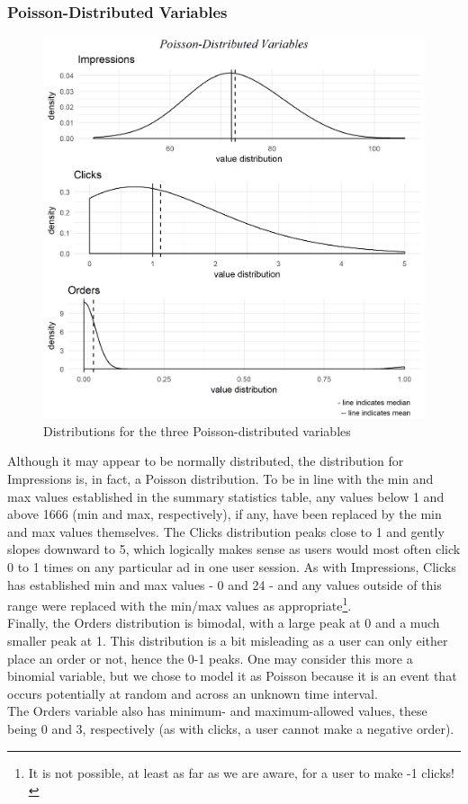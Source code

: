 \subsubsection{Poisson-Distributed Variables}
\begin{figure}[!h]
    \centering
    \includegraphics[scale = 0.7]{poisson_plots.png}
    \caption{Distributions for the three Poisson-distributed variables}
    \label{fig:Poission}
\end{figure}
Although it may appear to be normally distributed, the distribution for Impressions is, in fact, a Poisson distribution. To be in line with the min and max values established in the summary statistics table, any values below 1 and above 1666 (min and max, respectively), if any, have been replaced by the min and max values themselves. 
The Clicks distribution peaks close to 1 and gently slopes downward to 5, which logically makes sense as users would most often click 0 to 1 times on any particular ad in one user session. As with Impressions, Clicks has established min and max values - 0 and 24 - and any values outside of this range were replaced with the min/max values as appropriate\footnote{It is not possible, at least as far as we are aware, for a user to make -1 clicks!}.\\
Finally, the Orders distribution is bimodal, with a large peak at 0 and a much smaller peak at 1. This distribution is a bit misleading as a user can only either place an order or not, hence the 0-1 peaks. One may consider this more a binomial variable, but we chose to model it as Poisson because it is an event that occurs potentially at random and across an unknown time interval.\\
The Orders variable also has minimum- and maximum-allowed values, these being 0 and 3, respectively (as with clicks, a user cannot make a negative order).

